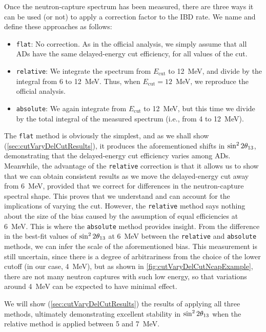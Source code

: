 \documentclass[../thesis.tex]{subfiles}
\begin{document}
Once the neutron-capture spectrum has been measured, there are three ways it can be used (or not) to apply a correction factor to the IBD rate. We name and define these approaches as follows:

\begin{itemize}
\item \texttt{flat}: No correction. As in the official analysis, we simply assume that all ADs have the same delayed-energy cut efficiency, for all values of the cut.
\item \texttt{relative}: We integrate the spectrum from $E_{\mathrm{cut}}$ to 12~MeV, and divide by the integral from 6 to 12~MeV. Thus, when $E_{\mathrm{cut}} = 12$~MeV, we reproduce the official analysis.
\item \texttt{absolute}: We again integrate from $E_{\mathrm{cut}}$ to 12~MeV, but this time we divide by the total integral of the measured spectrum (i.e., from 4 to 12~MeV).
\end{itemize}

The \texttt{flat} method is obviously the simplest, and as we shall show (\autoref{sec:cutVaryDelCutResults}), it produces the aforementioned shifts in $\sin^2 2\theta_{13}$, demonstrating that the delayed-energy cut efficiency varies among ADs. Meanwhile, the advantage of the \texttt{relative} correction is that it allows us to show that we can obtain consistent results as we move the delayed-energy cut away from 6~MeV, provided that we correct for differences in the neutron-capture spectral shape. This proves that we understand and can account for the implications of varying the cut. However, the \texttt{relative} method says nothing about the size of the bias caused by the assumption of equal efficiencies at 6~MeV. This is where the \texttt{absolute} method provides insight. From the difference in the best-fit values of $\sin^2 2\theta_{13}$ at 6~MeV between the \texttt{relative} and \texttt{absolute} methods, we can infer the scale of the aforementioned bias. This measurement is still uncertain, since there is a degree of arbitrariness from the choice of the lower cutoff (in our case, 4~MeV), but as shown in \autoref{fig:cutVaryDelCutNcapExample}, there are not many neutron captures with such low energy, so that variations around 4~MeV can be expected to have minimal effect.

We will show (\autoref{sec:cutVaryDelCutResults}) the results of applying all three methods, ultimately demonstrating excellent stability in $\sin^2 2\theta_{13}$ when the relative method is applied between 5 and 7~MeV.
\end{document}
